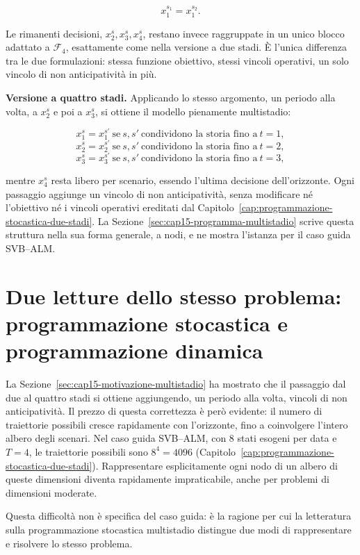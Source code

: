 \[
x_1^{s_1}=x_1^{s_2}.
\]

Le rimanenti decisioni, $x_2^s,x_3^s,x_4^s$, restano invece raggruppate in un
unico blocco adattato a $\mathcal F_4$, esattamente come nella versione a due
stadi. \`E l'unica differenza tra le due formulazioni: stessa funzione
obiettivo, stessi vincoli operativi, un solo vincolo di non anticipativit\`a
in pi\`u.

\medskip
\noindent
\textbf{Versione a quattro stadi.} Applicando lo stesso argomento, un periodo
alla volta, a $x_2^s$ e poi a $x_3^s$, si ottiene il modello pienamente
multistadio:

\[
x_1^{s}=x_1^{s'}\ \text{se}\ s,s'\ \text{condividono la storia fino a}\ t=1,
\]
\[
x_2^{s}=x_2^{s'}\ \text{se}\ s,s'\ \text{condividono la storia fino a}\ t=2,
\]
\[
x_3^{s}=x_3^{s'}\ \text{se}\ s,s'\ \text{condividono la storia fino a}\ t=3,
\]

mentre $x_4^s$ resta libero per scenario, essendo l'ultima decisione
dell'orizzonte. Ogni passaggio aggiunge un vincolo di non anticipativit\`a,
senza modificare n\'e l'obiettivo n\'e i vincoli operativi ereditati dal
Capitolo~\ref{cap:programmazione-stocastica-due-stadi}. La Sezione~\ref{sec:cap15-programma-multistadio}
scrive questa struttura nella sua forma generale, a nodi, e ne mostra
l'istanza per il caso guida SVB--ALM.

\section{Due letture dello stesso problema: programmazione stocastica e
programmazione dinamica}

\label{sec:cap15-ps-vs-dsp}

La Sezione~\ref{sec:cap15-motivazione-multistadio} ha mostrato che il
passaggio dal due al quattro stadi si ottiene aggiungendo, un periodo alla
volta, vincoli di non anticipativit\`a. Il prezzo di questa correttezza \`e
per\`o evidente: il numero di traiettorie possibili cresce rapidamente con
l'orizzonte, fino a coinvolgere l'intero albero degli scenari. Nel caso
guida SVB--ALM, con $8$ stati esogeni per data e $T=4$, le traiettorie
possibili sono $8^4=4096$ (Capitolo~\ref{cap:programmazione-stocastica-due-stadi}).
Rappresentare esplicitamente ogni nodo di un albero di queste dimensioni
diventa rapidamente impraticabile, anche per problemi di dimensioni
moderate.

Questa difficolt\`a non \`e specifica del caso guida: \`e la ragione per cui
la letteratura sulla programmazione stocastica multistadio distingue due
modi di rappresentare e risolvere lo stesso problema.

